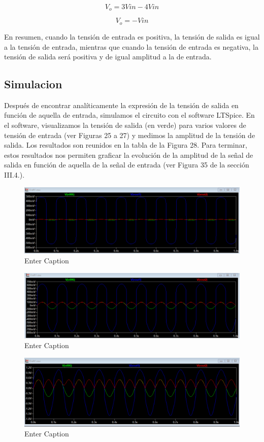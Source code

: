 \[V_o = 3V{in} - 4V{in}\]

\[V_o = - V{in} \]

En resumen, cuando la tensión de entrada es positiva, la tensión de salida es igual a la tensión de entrada, mientras que cuando la tensión de entrada es negativa, la tensión de salida será positiva y de igual amplitud a la de entrada.


\subsection{Simulacion}
Después de encontrar analíticamente la expresión de la tensión de salida en función de aquella de entrada, simulamos el circuito con el software LTSpice. En el
software, visualizamos la tensión de salida (en verde) para varios valores de tensión de entrada (ver Figuras 25 a 27) y medimos la amplitud de la tensión de salida. Los resultados son reunidos en la tabla de la Figura 28. Para terminar, estos resultados nos permiten graficar la evolución de la amplitud de la señal de salida en función de aquella de la señal de entrada (ver Figura 35 de la sección III.4.).

\begin{figure}
    \centering
    \includegraphics[width=0.5\linewidth]{Secciones/Circuito3/simulacion10mv.png}
    \caption{Enter Caption}
    \label{fig:Simulacion10mv}
\end{figure}

\begin{figure}
    \centering
    \includegraphics[width=0.5\linewidth]{Secciones/Circuito3/simulacion100mv.png}
    \caption{Enter Caption}
    \label{fig:Simulacion100mv}
\end{figure}

\begin{figure}
    \centering
    \includegraphics[width=0.5\linewidth]{Secciones/Circuito3/simulacion500mv.png}
    \caption{Enter Caption}
    \label{fig:Simulacion500mv}
\end{figure}


